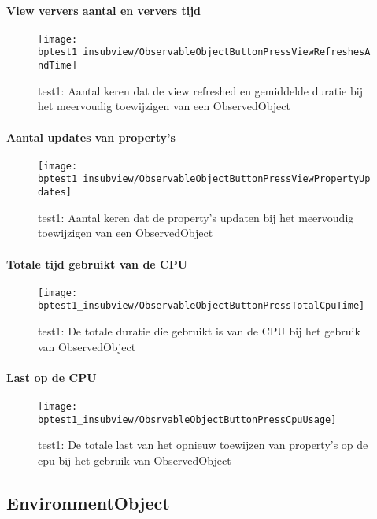 \paragraph{View ververs aantal en ververs tijd}
\begin{figure}[H]
    \centering
    \texttt{[image: bptest1\_insubview/ObservableObjectButtonPressViewRefreshesAndTime]} 
    \caption{test1: Aantal keren dat de view refreshed en gemiddelde duratie bij het meervoudig toewijzigen van een ObservedObject}
    \label{fig:viewRefresheObservedObject1}
\end{figure}
\paragraph{Aantal updates van property's}
\begin{figure}[H]
    \centering
    \texttt{[image: bptest1\_insubview/ObservableObjectButtonPressViewPropertyUpdates]} 
    \caption{test1: Aantal keren dat de property's updaten bij het meervoudig toewijzigen van een ObservedObject}
    \label{fig:propertyUpdatesObservedObject1}
\end{figure}
\paragraph{Totale tijd gebruikt van de CPU}
\begin{figure}[H]
    \centering
    \texttt{[image: bptest1\_insubview/ObservableObjectButtonPressTotalCpuTime]} 
    \caption{test1: De totale duratie die gebruikt is van de CPU bij het gebruik van ObservedObject}
    \label{fig:cpuUsageTimeObservedObject1}
\end{figure}
\paragraph{Last op de CPU}
\begin{figure}[H]
    \centering
    \texttt{[image: bptest1\_insubview/ObsrvableObjectButtonPressCpuUsage]} 
    \caption{test1: De totale last van het opnieuw toewijzen van property's op de cpu bij het gebruik van ObservedObject}
    \label{fig:cpuWeightObservedObject1}
\end{figure}

\subsection{EnvironmentObject}
